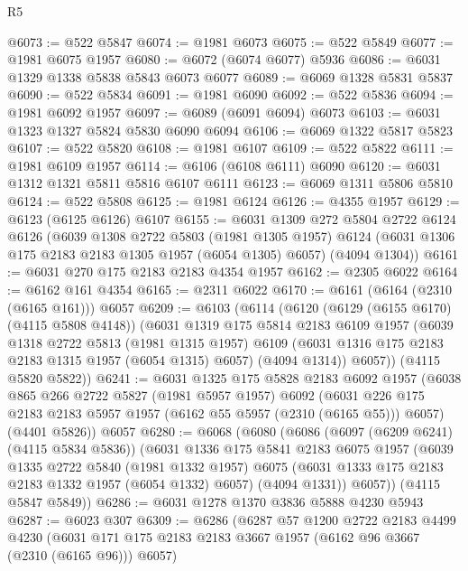 \begin{lexlean}{R5}
\begin{coremodule}
@6073 := @522 @5847
@6074 := @1981 @6073
@6075 := @522 @5849
@6077 := @1981 @6075 @1957
@6080 := @6072 (@6074 @6077) @5936
@6086 := @6031 @1329 @1338 @5838 @5843 @6073 @6077
@6089 := @6069 @1328 @5831 @5837
@6090 := @522 @5834
@6091 := @1981 @6090
@6092 := @522 @5836
@6094 := @1981 @6092 @1957
@6097 := @6089 (@6091 @6094) @6073
@6103 := @6031 @1323 @1327 @5824 @5830 @6090 @6094
@6106 := @6069 @1322 @5817 @5823
@6107 := @522 @5820
@6108 := @1981 @6107
@6109 := @522 @5822
@6111 := @1981 @6109 @1957
@6114 := @6106 (@6108 @6111) @6090
@6120 := @6031 @1312 @1321 @5811 @5816 @6107 @6111
@6123 := @6069 @1311 @5806 @5810
@6124 := @522 @5808
@6125 := @1981 @6124
@6126 := @4355 @1957
@6129 := @6123 (@6125 @6126) @6107
@6155 := @6031
    @1309
    @272
    @5804
    @2722
    @6124
    @6126
    (@6039
      @1308
      @2722
      @5803
      (@1981 @1305 @1957)
      @6124
      (@6031 @1306 @175 @2183 @2183 @1305 @1957 (@6054 @1305) @6057)
      (@4094 @1304))
@6161 := @6031 @270 @175 @2183 @2183 @4354 @1957
@6162 := @2305 @6022
@6164 := @6162 @161 @4354
@6165 := @2311 @6022
@6170 := @6161 (@6164 (@2310 (@6165 @161))) @6057
@6209 := @6103
    (@6114
      (@6120
        (@6129 (@6155 @6170) (@4115 @5808 @4148))
        (@6031
          @1319
          @175
          @5814
          @2183
          @6109
          @1957
          (@6039
            @1318
            @2722
            @5813
            (@1981 @1315 @1957)
            @6109
            (@6031 @1316 @175 @2183 @2183 @1315 @1957 (@6054 @1315) @6057)
            (@4094 @1314))
          @6057))
      (@4115 @5820 @5822))
@6241 := @6031
    @1325
    @175
    @5828
    @2183
    @6092
    @1957
    (@6038
      @865
      @266
      @2722
      @5827
      (@1981 @5957 @1957)
      @6092
      (@6031 @226 @175 @2183 @2183 @5957 @1957 (@6162 @55 @5957 (@2310 (@6165 @55))) @6057)
      (@4401 @5826))
    @6057
@6280 := @6068
    (@6080
      (@6086
        (@6097 (@6209 @6241) (@4115 @5834 @5836))
        (@6031
          @1336
          @175
          @5841
          @2183
          @6075
          @1957
          (@6039
            @1335
            @2722
            @5840
            (@1981 @1332 @1957)
            @6075
            (@6031 @1333 @175 @2183 @2183 @1332 @1957 (@6054 @1332) @6057)
            (@4094 @1331))
          @6057))
      (@4115 @5847 @5849))
@6286 := @6031 @1278 @1370 @3836 @5888 @4230 @5943
@6287 := @6023 @307
@6309 := @6286
    (@6287
      @57
      @1200
      @2722
      @2183
      @4499
      @4230
      (@6031 @171 @175 @2183 @2183 @3667 @1957 (@6162 @96 @3667 (@2310 (@6165 @96))) @6057)

\end{coremodule}
\end{lexlean}
